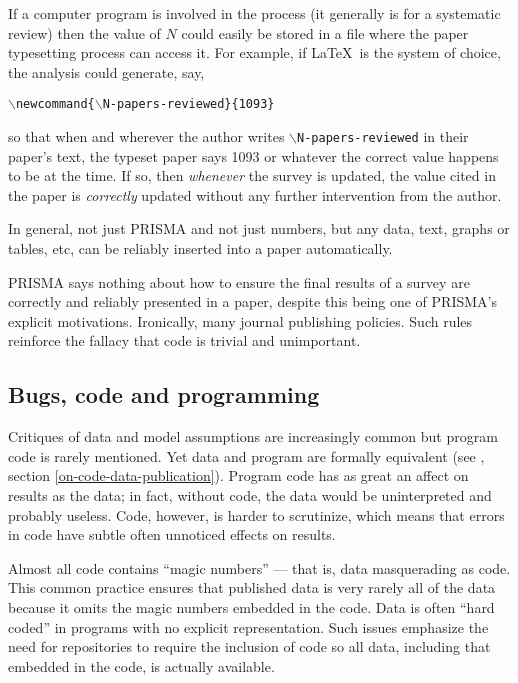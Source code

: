 \documentclass{comjnl}
\begin{document}
\begin{change}
If a computer program is involved in the process (it generally is for a systematic review) then the value of $N$ could easily be stored in a file where the paper typesetting process can access it. For example, if \LaTeX\ is the system of choice, the analysis could generate, say, 

\begin{center}\texttt{$\backslash$newcommand\{$\backslash$N-papers-reviewed\}\{1093\}}\end{center}

so that when and wherever the author writes \texttt{$\backslash$N-papers-reviewed} in their paper's text, the typeset paper says 1093 or whatever the correct value happens to be at the time. If so, then \emph{whenever\/} the survey is updated, the value cited in the paper is \emph{correctly\/} updated without any further intervention from the author. 

In general, not just PRISMA and not just numbers, but any data, text, graphs or tables, etc, can be reliably inserted into a paper automatically. 

PRISMA says nothing about how to ensure the final results of a survey are correctly and reliably presented in a paper, despite this being one of PRISMA's explicit motivations. Ironically, many journal publishing policies. Such rules reinforce the fallacy that code is trivial and unimportant. 
\end{change}

\subsection{Bugs, code and programming}\label{knowledge}
Critiques of data and model assumptions are increasingly common \cite{critiques,diagnosis-reviews} but program code is rarely mentioned. Yet data and program are formally equivalent (see \supplement, section \ref{on-code-data-publication}). Program code has as great an affect on results as the data; in fact, without code, the data would be uninterpreted and probably useless. Code, however, is harder to scrutinize, which means that errors in code have subtle often unnoticed effects on results.

Almost all code contains ``magic numbers'' --- that is, data masquerading as code. This common practice ensures that published data is very rarely all of the data because it omits the magic numbers embedded in the code. Data is often ``hard coded'' in programs with no explicit representation. Such issues emphasize the need for repositories to require the inclusion of code so all data, including that embedded in the code, is actually available. 
\end{document}
